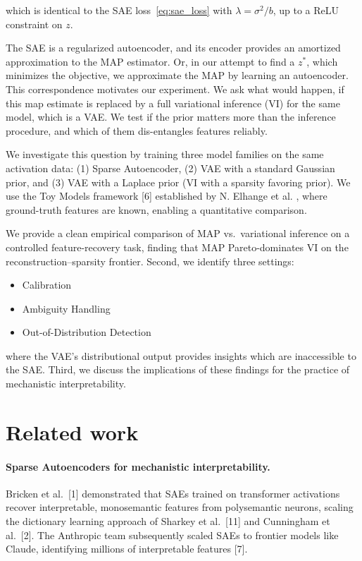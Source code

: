 \documentclass{article}
\begin{document}
which is identical to the SAE loss~\eqref{eq:sae_loss} with $\lambda = \sigma^2/b$, up to a ReLU constraint on $z$. 

The SAE is a regularized autoencoder, and its encoder provides an amortized approximation to the MAP estimator. Or, in our attempt to find a $z^*$, which minimizes the objective, we approximate the MAP by learning an autoencoder. This correspondence motivates our experiment. We ask what would happen, if this map estimate is replaced by a full variational inference (VI) for the same model, which is a VAE. We test if the prior matters more than the inference procedure, and which of them dis-entangles features reliably.

We investigate this question by training three model families on the same activation data: (1) Sparse Autoencoder, (2) VAE with a standard Gaussian prior, and (3) VAE with a Laplace prior (VI with a sparsity favoring prior). We use the Toy Models framework [6] established by N. Elhange et al. , where ground-truth features are known, enabling a quantitative comparison.

We provide a clean empirical comparison of MAP vs.\ variational inference on a controlled feature-recovery task, finding that MAP Pareto-dominates VI on the reconstruction--sparsity frontier. Second, we identify three settings:
\begin{itemize}
    \item Calibration
    \item Ambiguity Handling
    \item Out-of-Distribution Detection
\end{itemize}
where the VAE's distributional output provides insights which are inaccessible to the SAE. Third, we discuss the implications of these findings for the practice of mechanistic interpretability.


\section{Related work}


\paragraph{Sparse Autoencoders for mechanistic interpretability.}
Bricken et al.~[1] demonstrated that SAEs trained on transformer activations recover interpretable, monosemantic features from polysemantic neurons, scaling the dictionary learning approach of Sharkey et al.~[11] and Cunningham et al.~[2]. The Anthropic team subsequently scaled SAEs to frontier models like Claude, identifying millions of interpretable features [7].
\end{document}
